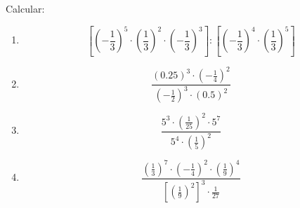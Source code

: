 \begin{exercici}
Calcular:

\begin{enumerate}
\item[a)] 
\begin{equation*}
\left[ \left( -\frac{1}{3}\right) ^{5}\cdot \left( \frac{1}{3}\right)
^{2}\cdot \left( -\frac{1}{3}\right) ^{3}\right] :\left[ \left( -\frac{1}{3}%
\right) ^{4}\cdot \left( \frac{1}{3}\right) ^{5}\right]
\end{equation*}

\item[b)] 
\begin{equation*}
\frac{\left( 0.25\right) ^{3}\cdot \left( -\frac{1}{4}\right) ^{2}}{\left( -%
\frac{1}{2}\right) ^{3}\cdot \left( 0.5\right) ^{2}}
\end{equation*}

\item[c)] 
\begin{equation*}
\frac{5^{3}\cdot \left( \frac{1}{25}\right) ^{2}\cdot 5^{7}}{5^{4}\cdot
\left( \frac{1}{5}\right) ^{2}}
\end{equation*}

\item[d)] 
\begin{equation*}
\frac{\left( \frac{1}{3}\right) ^{7}\cdot \left( -\frac{1}{4}\right)
^{2}\cdot \left( \frac{1}{9}\right) ^{4}}{\left[ \left( \frac{1}{9}\right)
^{2}\right] ^{3}\cdot \frac{1}{27}}
\end{equation*}
\end{enumerate}

\end{exercici}

